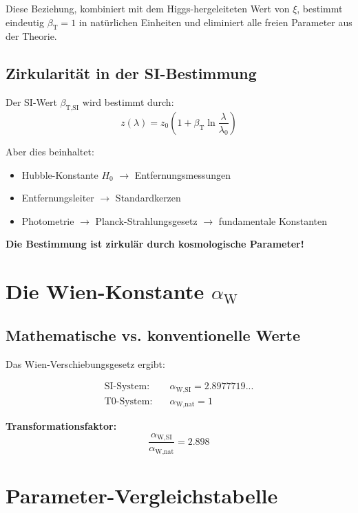 \documentclass[12pt,a4paper]{article}
\newcommand{\xipar}{\xi}
\newcommand{\betaTSI}{\beta_{\text{T,SI}}}
\newcommand{\alphaWSI}{\alpha_{\text{W,SI}}}
\newcommand{\alphaWnat}{\alpha_{\text{W,nat}}}
\begin{document}
	Diese Beziehung, kombiniert mit dem Higgs-hergeleiteten Wert von $\xipar$, bestimmt eindeutig $\beta_{\text{T}} = 1$ in natürlichen Einheiten und eliminiert alle freien Parameter aus der Theorie.
	
	\subsection{Zirkularität in der SI-Bestimmung}
	\label{subsec:beta_zirkularitaet}
	
	Der SI-Wert $\betaTSI$ wird bestimmt durch:
	$$z(\lambda) = z_0\left(1 + \beta_{\text{T}} \ln\frac{\lambda}{\lambda_0}\right)$$
	
	Aber dies beinhaltet:
	\begin{itemize}
		\item Hubble-Konstante $H_0$ $\rightarrow$ Entfernungsmessungen
		\item Entfernungsleiter $\rightarrow$ Standardkerzen
		\item Photometrie $\rightarrow$ Planck-Strahlungsgesetz $\rightarrow$ fundamentale Konstanten
	\end{itemize}
	
	\textbf{Die Bestimmung ist zirkulär durch kosmologische Parameter!}
	
	\section{Die Wien-Konstante $\alpha_{\text{W}}$}
	\label{sec:alpha_w}
	
	\subsection{Mathematische vs. konventionelle Werte}
	\label{subsec:wien_werte}
	
	Das Wien-Verschiebungsgesetz ergibt:
	
	\begin{align}
		\text{SI-System:} \quad &\alphaWSI = 2.8977719... \\
		\text{T0-System:} \quad &\alphaWnat = 1
	\end{align}
	
	\textbf{Transformationsfaktor:}
	$$\frac{\alphaWSI}{\alphaWnat} = 2.898$$
	
	\section{Parameter-Vergleichstabelle}
	\label{sec:parameter_vergleich}
	
\end{document}

